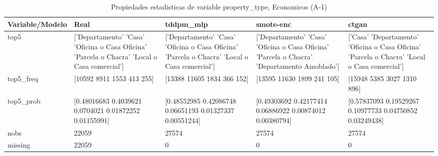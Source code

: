 \begin{table}[H]
\centering
\fontsize{8}{14}\selectfont
\caption{Propiedades  estadisticas de variable property\_type, Economicos (A-1)}
\label{table-stats-economicos-a-1-property_type}
\begin{tabular}{|l|m{10em}|m{10em}|m{10em}|m{10em}|}
\hline
 \rowcolor[gray]{0.8}
Variable/Modelo & Real & tddpm\_mlp & smote-enc & ctgan \\
\hline top5 & ['Departamento' 'Casa' 'Oficina o Casa Oficina' 'Parcela o Chacra'
 'Local o Casa comercial'] & ['Departamento' 'Casa' 'Oficina o Casa Oficina' 'Parcela o Chacra'
 'Local o Casa comercial'] & ['Departamento' 'Casa' 'Oficina o Casa Oficina' 'Parcela o Chacra'
 'Departamento Amoblado'] & ['Casa' 'Departamento' 'Oficina o Casa Oficina' 'Parcela o Chacra'
 'Local o Casa comercial'] \\
\hline top5\_freq & [10592  8911  1553   413   255] & [13388 11605  1834   366   152] & [13595 11630  1899   241   105] & [15948  5385  3027  1310   896] \\
\hline top5\_prob & [0.48016683 0.4039621  0.0704021  0.01872252 0.01155991] & [0.48552985 0.42086748 0.06651193 0.01327337 0.00551244] & [0.49303692 0.42177414 0.06886922 0.00874012 0.00380794] & [0.57837093 0.19529267 0.10977733 0.04750852 0.03249438] \\
\hline nobs & 22059 & 27574 & 27574 & 27574 \\
\hline missing & 22059 & 0 & 0 & 0 \\
\hline
\end{tabular}
\end{table}
